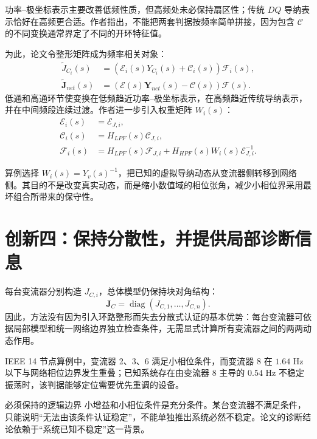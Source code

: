 \documentclass[11pt,a4paper]{ctexart}
\begin{document}
功率--极坐标表示主要改善低频性质，但高频处未必保持扇区性；传统 $DQ$ 导纳表示恰好在高频更合适。作者指出，不能把两套判据按频率简单拼接，因为包含 $\mathcal C$ 的不同变换通常界定了不同的开环特征值。

为此，论文令整形矩阵成为频率相关对象：
\begin{align}
\widetilde J_{C_i}(s)&=(\mathcal E_i(s)Y_{C_i}(s)+\mathcal C_i(s))\mathcal F_i(s),\\
\widetilde{\mathbf J}_{net}(s)&=(\boldsymbol{\mathcal E}(s)\mathbf Y_{net}(s)-\boldsymbol{\mathcal C}(s))\boldsymbol{\mathcal F}(s).
\end{align}
低通和高通环节使变换在低频趋近功率--极坐标表示，在高频趋近传统导纳表示，并在中间频段连续过渡。作者进一步引入权重矩阵 $W_i(s)$：
\begin{align}
\mathcal E_i(s)&=\mathcal E_{J,i},\\
\mathcal C_i(s)&=H_{LPF}(s)\mathcal C_{J,i},\\
\mathcal F_i(s)&=H_{LPF}(s)\mathcal F_{J,i}
+H_{HPF}(s)W_i(s)\mathcal E_{J,i}^{-1}.
\end{align}

算例选择 $W_i(s)=Y_v(s)^{-1}$，把已知的虚拟导纳动态从变流器侧转移到网络侧。其目的不是改变真实动态，而是缩小数值域的相位张角，减少小相位界采用最坏组合所带来的保守性。

\section{创新四：保持分散性，并提供局部诊断信息}

每台变流器分别构造 $J_{C,i}$，总体模型仍保持块对角结构：
\begin{equation}
\mathbf J_C=\operatorname{diag}(J_{C,1},\ldots,J_{C,n}).
\end{equation}
因此，方法没有因为引入环路整形而失去分散式认证的基本优势：每台变流器可依据局部模型和统一网络边界独立检查条件，无需显式计算所有变流器之间的两两动态作用。

IEEE 14 节点算例中，变流器 2、3、6 满足小相位条件，而变流器 8 在 $1.64$ Hz 以下与网络相位边界发生重叠；已知系统存在由变流器 8 主导的 $0.54$ Hz 不稳定振荡时，该判据能够定位需要优先重调的设备。

\begin{claimbox}{必须保持的逻辑边界}
小增益和小相位条件是充分条件。某台变流器不满足条件，只能说明“无法由该条件认证稳定”，不能单独推出系统必然不稳定。论文的诊断结论依赖于“系统已知不稳定”这一背景。
\end{claimbox}
\end{document}
